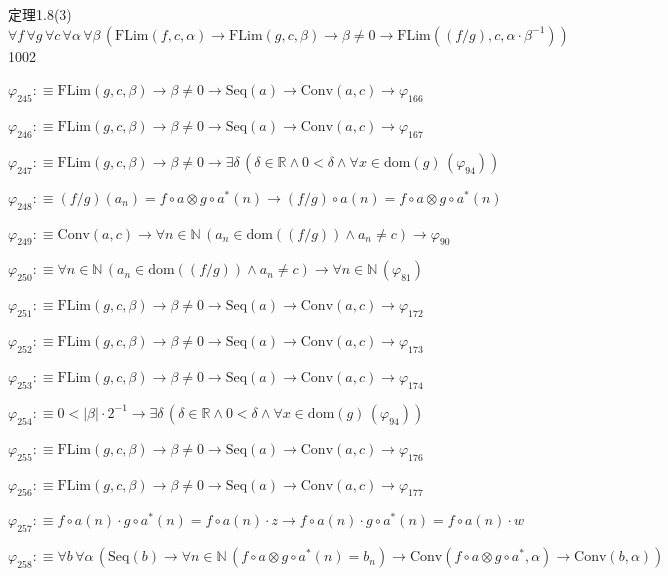 \begin{fullproof}{定理1.8(3)}{$\forall f\,\forall g\,\forall c\,\forall \alpha\,\forall \beta\,(\mathrm{FLim}(f,c,\alpha) \to \mathrm{FLim}(g,c,\beta) \to \beta \neq 0 \to \mathrm{FLim}((f / g),c,\alpha \cdot \beta^{-1}))$}{1002}
\begin{abbrevlist}
\item $\varphi_{245} :\equiv \mathrm{FLim}(g,c,\beta) \to \beta \neq 0 \to \mathrm{Seq}(a) \to \mathrm{Conv}(a,c) \to \varphi_{166}$
\item $\varphi_{246} :\equiv \mathrm{FLim}(g,c,\beta) \to \beta \neq 0 \to \mathrm{Seq}(a) \to \mathrm{Conv}(a,c) \to \varphi_{167}$
\item $\varphi_{247} :\equiv \mathrm{FLim}(g,c,\beta) \to \beta \neq 0 \to \exists \delta\,(\delta \in \mathbb{R} \land 0 < \delta \land \forall x \in \mathrm{dom}(g)\,(\varphi_{94}))$
\item $\varphi_{248} :\equiv (f / g)(a_{n}) = f \circ a \otimes g \circ a^{\ast}(n) \to (f / g) \circ a(n) = f \circ a \otimes g \circ a^{\ast}(n)$
\item $\varphi_{249} :\equiv \mathrm{Conv}(a,c) \to \forall n \in \mathbb{N}\,(a_{n} \in \mathrm{dom}((f / g)) \land a_{n} \neq c) \to \varphi_{90}$
\item $\varphi_{250} :\equiv \forall n \in \mathbb{N}\,(a_{n} \in \mathrm{dom}((f / g)) \land a_{n} \neq c) \to \forall n \in \mathbb{N}\,(\varphi_{81})$
\item $\varphi_{251} :\equiv \mathrm{FLim}(g,c,\beta) \to \beta \neq 0 \to \mathrm{Seq}(a) \to \mathrm{Conv}(a,c) \to \varphi_{172}$
\item $\varphi_{252} :\equiv \mathrm{FLim}(g,c,\beta) \to \beta \neq 0 \to \mathrm{Seq}(a) \to \mathrm{Conv}(a,c) \to \varphi_{173}$
\item $\varphi_{253} :\equiv \mathrm{FLim}(g,c,\beta) \to \beta \neq 0 \to \mathrm{Seq}(a) \to \mathrm{Conv}(a,c) \to \varphi_{174}$
\item $\varphi_{254} :\equiv 0 < \lvert \beta \rvert \cdot 2^{-1} \to \exists \delta\,(\delta \in \mathbb{R} \land 0 < \delta \land \forall x \in \mathrm{dom}(g)\,(\varphi_{94}))$
\item $\varphi_{255} :\equiv \mathrm{FLim}(g,c,\beta) \to \beta \neq 0 \to \mathrm{Seq}(a) \to \mathrm{Conv}(a,c) \to \varphi_{176}$
\item $\varphi_{256} :\equiv \mathrm{FLim}(g,c,\beta) \to \beta \neq 0 \to \mathrm{Seq}(a) \to \mathrm{Conv}(a,c) \to \varphi_{177}$
\item $\varphi_{257} :\equiv f \circ a(n) \cdot g \circ a^{\ast}(n) = f \circ a(n) \cdot z \to f \circ a(n) \cdot g \circ a^{\ast}(n) = f \circ a(n) \cdot w$
\item $\varphi_{258} :\equiv \forall b\,\forall \alpha\,(\mathrm{Seq}(b) \to \forall n \in \mathbb{N}\,(f \circ a \otimes g \circ a^{\ast}(n) = b_{n}) \to \mathrm{Conv}(f \circ a \otimes g \circ a^{\ast},\alpha) \to \mathrm{Conv}(b,\alpha))$

\end{abbrevlist}
\end{fullproof}
